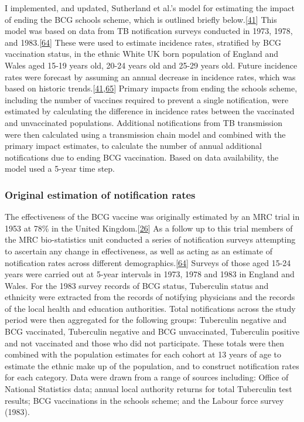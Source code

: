 \documentclass[11pt,twoside]{bristolthesis}
\begin{document}
  I implemented, and updated, Sutherland et al.'s model for estimating the impact of ending the BCG schools scheme, which is outlined briefly below.{[}\protect\hyperlink{ref-Sutherland1989}{41}{]} This model was based on data from TB notification surveys conducted in 1973, 1978, and 1983.{[}\protect\hyperlink{ref-Sutherland1987a}{64}{]} These were used to estimate incidence rates, stratified by BCG vaccination status, in the ethnic White UK born population of England and Wales aged 15-19 years old, 20-24 years old and 25-29 years old. Future incidence rates were forecast by assuming an annual decrease in incidence rates, which was based on historic trends.{[}\protect\hyperlink{ref-Sutherland1989}{41},\protect\hyperlink{ref-Springett1988}{65}{]} Primary impacts from ending the schools scheme, including the number of vaccines required to prevent a single notification, were estimated by calculating the difference in incidence rates between the vaccinated and unvaccinated populations. Additional notifications from TB transmission were then calculated using a transmission chain model and combined with the primary impact estimates, to calculate the number of annual additional notifications due to ending BCG vaccination. Based on data availability, the model used a 5-year time step.
  
  \hypertarget{original-estimation-of-notification-rates}{%
  \subsubsection{Original estimation of notification rates}\label{original-estimation-of-notification-rates}}
  
  The effectiveness of the BCG vaccine was originally estimated by an MRC trial in 1953 at 78\% in the United Kingdom.{[}\protect\hyperlink{ref-Hart1972}{26}{]} As a follow up to this trial members of the MRC bio-statistics unit conducted a series of notification surveys attempting to ascertain any change in effectiveness, as well as acting as an estimate of notification rates across different demographics.{[}\protect\hyperlink{ref-Sutherland1987a}{64}{]} Surveys of those aged 15-24 years were carried out at 5-year intervals in 1973, 1978 and 1983 in England and Wales. For the 1983 survey records of BCG status, Tuberculin status and ethnicity were extracted from the records of notifying physicians and the records of the local health and education authorities. Total notifications across the study period were then aggregated for the following groups: Tuberculin negative and BCG vaccinated, Tuberculin negative and BCG unvaccinated, Tuberculin positive and not vaccinated and those who did not participate. These totals were then combined with the population estimates for each cohort at 13 years of age to estimate the ethnic make up of the population, and to construct notification rates for each category. Data were drawn from a range of sources including: Office of National Statistics data; annual local authority returns for total Tuberculin test results; BCG vaccinations in the schools scheme; and the Labour force survey (1983).
  
\end{document}
